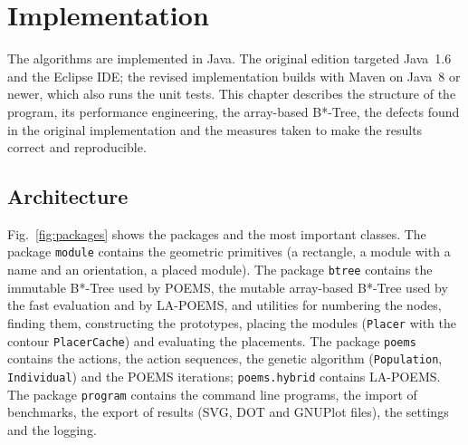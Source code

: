\chapter{Implementation}
\label{sec:implementation}

The algorithms are implemented in Java. The original edition targeted Java~1.6 and the Eclipse IDE; the revised implementation builds with Maven on Java~8 or newer, which also runs the unit tests. This chapter describes the structure of the program, its performance engineering, the array-based B*-Tree, the defects found in the original implementation and the measures taken to make the results correct and reproducible.

\section{Architecture}

Fig.~\ref{fig:packages} shows the packages and the most important classes. The package {\tt module} contains the geometric primitives (a rectangle, a module with a name and an orientation, a placed module). The package {\tt btree} contains the immutable B*-Tree used by POEMS, the mutable array-based B*-Tree used by the fast evaluation and by LA-POEMS, and utilities for numbering the nodes, finding them, constructing the prototypes, placing the modules ({\tt Placer} with the contour {\tt PlacerCache}) and evaluating the placements. The package {\tt poems} contains the actions, the action sequences, the genetic algorithm ({\tt Population}, {\tt Individual}) and the POEMS iterations; {\tt poems.hybrid} contains LA-POEMS. The package {\tt program} contains the command line programs, the import of benchmarks, the export of results (SVG, DOT and GNUPlot files), the settings and the logging.

